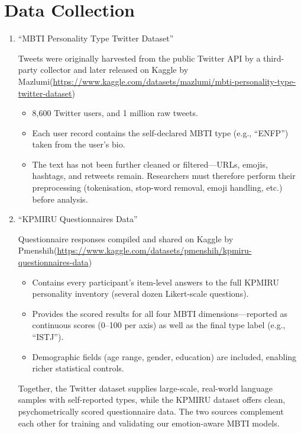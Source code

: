 \documentclass[12pt]{article}
\begin{document}
	\section{Data Collection}
	\begin{enumerate}
		\item “MBTI Personality Type Twitter Dataset”
		
		Tweets were originally harvested from the public Twitter API by a third-party collector and later released on Kaggle by Mazlumi(\url{https://www.kaggle.com/datasets/mazlumi/mbti-personality-type-twitter-dataset})
		\begin{itemize}
			\item 8,600 Twitter users, and 1 million raw tweets.
			\item Each user record contains the self-declared MBTI type (e.g., “ENFP”) taken from the user’s bio.
			\item The text has not been further cleaned or filtered—URLs, emojis, hashtags, and retweets remain. Researchers must therefore perform their preprocessing (tokenisation, stop-word removal, emoji handling, etc.) before analysis.    
		\end{itemize}
		\item “KPMIRU Questionnaires Data”
		
		Questionnaire responses compiled and shared on Kaggle by Pmenshih(\url{https://www.kaggle.com/datasets/pmenshih/kpmiru-questionnaires-data})
		\begin{itemize}
			\item Contains every participant’s item-level answers to the full KPMIRU personality inventory (several dozen Likert-scale questions).
			\item Provides the scored results for all four MBTI dimensions—reported as continuous scores (0–100 per axis) as well as the final type label (e.g., “ISTJ”).
			\item Demographic fields (age range, gender, education) are included, enabling richer statistical controls. 
		\end{itemize}
		
		Together, the Twitter dataset supplies large-scale, real-world language samples with self-reported types, while the KPMIRU dataset offers clean, psychometrically scored questionnaire data. The two sources complement each other for training and validating our emotion-aware MBTI models.
	\end{enumerate}
\end{document}

